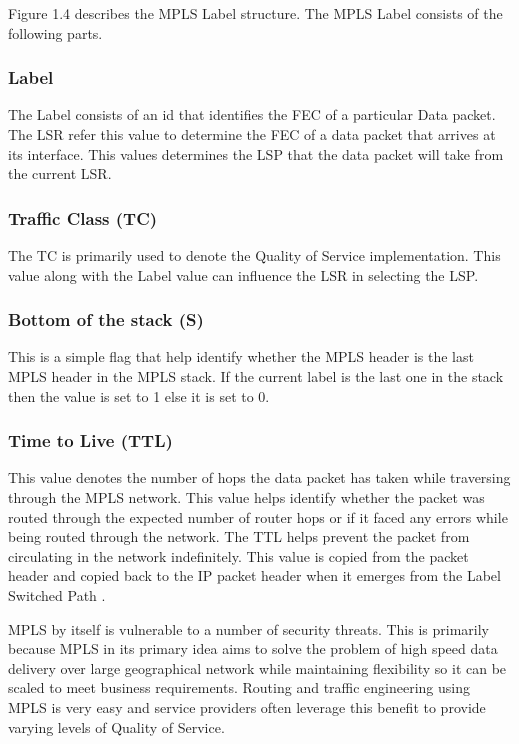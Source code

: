 Figure 1.4 describes the MPLS Label structure. The MPLS Label consists of the following parts.
\subsubsection*{Label}
The Label consists of an id that identifies the FEC of a particular Data packet. The LSR refer this value to determine the FEC of a data packet that arrives at its interface. This values determines the LSP that the data packet will take from the current LSR.

\subsubsection*{Traffic Class (TC)}
The TC is primarily used to denote the Quality of Service implementation. This value along with the Label value can influence the LSR in selecting the LSP.

\subsubsection*{Bottom of the stack (S)}
This is a simple flag that help identify whether the MPLS header is the last MPLS header in the MPLS stack. If the current label is the last one in the stack then the value is set to 1 else it is set to 0.

\subsubsection*{Time to Live (TTL)}
This value denotes the number of hops the data packet has taken while traversing through the MPLS network. This value helps identify whether the packet was routed through the expected number of router hops or if it faced any errors while being routed through the network. The TTL helps prevent the packet from circulating in the network indefinitely. This value is copied from the packet header and copied back to the IP packet header when it emerges from the Label Switched Path \cite{pise2005packet}.


MPLS by itself is vulnerable to a number of security threats. This is primarily because MPLS in its primary idea aims to solve the problem of high speed data delivery over large geographical network while maintaining flexibility so it can be scaled to meet business requirements. Routing and traffic engineering using MPLS is very easy and service providers often leverage this benefit to provide varying levels of Quality of Service.

